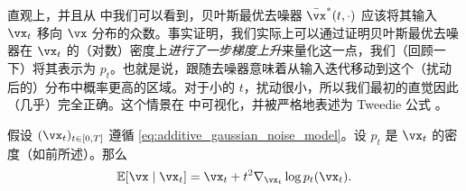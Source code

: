 \documentclass[../../book-main.tex]{subfiles}
\begin{document}
直观上，并且从  中我们可以看到，贝叶斯最优去噪器 \(\bar{\vx}^{\ast}(t, \cdot)\) 应该将其输入 \(\vx_{t}\) 移向 \(\vx\) 分布的众数。事实证明，我们实际上可以通过证明贝叶斯最优去噪器在 \(\vx_{t}\) 的（对数）密度上\textit{进行了一步梯度上升}来量化这一点，我们（回顾一下）将其表示为 \(p_{t}\)。也就是说，跟随去噪器意味着从输入迭代移动到这个（扰动后的）分布中概率更高的区域。对于小的 \(t\)，扰动很小，所以我们最初的直觉因此（几乎）完全正确。这个情景在  中可视化，并被严格地表述为 Tweedie 公式 \cite{Robbins1956AnEB}。
\begin{theorem}[Tweedie 公式]\label{thm:tweedie}
	假设 \((\vx_{t})_{t \in [0, T]}\) 遵循 \eqref{eq:additive_gaussian_noise_model}。设 \(p_{t}\) 是 \(\vx_{t}\) 的密度（如前所述）。那么
	\begin{equation}\label{eq:tweedie}
		\Ex[\vx \mid \vx_{t}] = \vx_{t} + t^{2}\nabla_{\vx_{t}} \log p_{t}(\vx_{t}).
	\end{equation}
\end{theorem}
\end{document}
